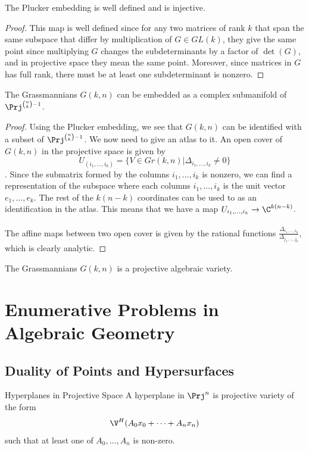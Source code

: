 \documentclass[a4paper]{article}
\begin{document}
\begin{prp}{}{} The Plucker embedding is well defined and is injective. 
\begin{proof}
This map is well defined since for any two matrices of rank $k$ that span the same subspace that differ by multiplication of $G\in GL(k)$, they give the same point since multiplying $G$ changes the subdeterminants by a factor of $\det(G)$, and in projective space they mean the same point. Moreover, since matrices in $G$ has full rank, there must be at least one subdeterminant is nonzero. 
\end{proof}
\end{prp}

\begin{thm}{}{} The Grassmannians $G(k,n)$ can be embedded as a complex submanifold of $\Prj^{\binom{n}{k}-1}$. 
\begin{proof}
Using the Plucker embedding, we see that $G(k,n)$ can be identified with a subset of $\Prj^{\binom{n}{k}-1}$. We now need to give an atlas to it. An open cover of $G(k,n)$ in the projective space is given by $$U_{(i_1,\dots,i_k)}=\{V\in Gr(k,n)|\Delta_{i_1,\dots,i_k}\neq 0\}$$. Since the submatrix formed by the columns $i_1,\dots,i_k$ is nonzero, we can find a representation of the subspace where each columns $i_1,\dots,i_k$ is the unit vector $e_1,\dots,e_k$. The rest of the $k(n-k)$ coordinates can be used to as an identification in the atlas. This means that we have a map $U_{i_1,\dots,i_k}\to\C^{k(n-k)}$. \\~\\
The affine maps between two open cover is given by the rational functions $\frac{\Delta_{i_1,\dots,i_k}}{\Delta_{j_1,\dots,j_k}}$, which is clearly analytic. 
\end{proof}
\end{thm}

\begin{thm}{}{} The Grassmannians $G(k,n)$ is a projective algebraic variety. 
\end{thm}

\pagebreak
\section{Enumerative Problems in Algebraic Geometry}
\subsection{Duality of Points and Hypersurfaces}
\begin{defn}{Hyperplanes in Projective Space}{} A hyperplane in $\Prj^n$ is projective variety of the form $$\V^H(A_0x_0+\cdots+A_nx_n)$$ such that at least one of $A_0,\dots,A_n$ is non-zero. 
\end{defn}
\end{document}
